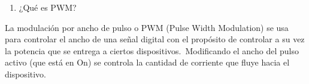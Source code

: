 \documentclass[12pt]{article}
\begin{document}
\vspace{\baselineskip}

\vspace{\baselineskip}

\vspace{\baselineskip}

\vspace{\baselineskip}
\begin{enumerate}
	\item {\fontsize{18pt}{21.6pt}\selectfont \textcolor[HTML]{0066B3}{¿Qué es PWM?}\par}
\end{enumerate}\par

La modulación por ancho de pulso o PWM (Pulse Width Modulation) se usa para controlar el ancho de una señal digital con el propósito de controlar a su vez la potencia que se entrega a ciertos dispositivos. Modificando el ancho del pulso activo (que está en On) se controla la cantidad de corriente que fluye hacia el dispositivo.\par
\end{document}
